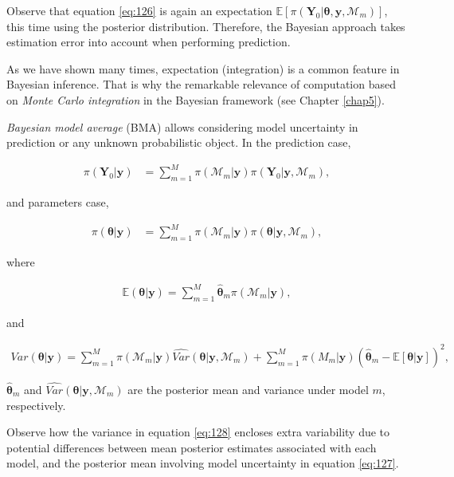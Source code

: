 Observe that equation \ref{eq:126} is again an expectation $\mathbb{E}[\pi(\mathbf{Y}_0|\mathbf{\theta},\mathbf{y},\mathcal{M}_m)]$, this time using the posterior distribution. Therefore,  the Bayesian approach takes estimation error into account when performing prediction. 

As we have shown many times, expectation (integration) is a common feature in Bayesian inference. That is why the remarkable relevance of computation based on \textit{Monte Carlo integration} in the Bayesian framework (see Chapter \ref{chap5}).  

\textit{Bayesian model average} (BMA) allows considering model uncertainty in prediction or any unknown probabilistic object. In the prediction case, 

\begin{align}
	\pi(\mathbf{Y}_0|\mathbf{y})&=\sum_{m=1}^M \pi(\mathcal{M}_m|\mathbf{y})\pi(\mathbf{Y}_0|\mathbf{y},\mathcal{M}_m),
\end{align}

and parameters case,

\begin{align}
	\pi(\mathbf{\theta}|\mathbf{y})&=\sum_{m=1}^M \pi(\mathcal{M}_m|\mathbf{y})\pi(\mathbf{\theta}|\mathbf{y},\mathcal{M}_m),
\end{align}

where 

\begin{align}
	\mathbb{E}(\mathbf{\theta}|\mathbf{y})=\sum_{m=1}^{M}\hat{\mathbf{\theta}}_m \pi(\mathcal{M}_m|\mathbf{y}),
	\label{eq:127}
\end{align}

and

\begin{align}
	Var(\mathbf{\theta}|\mathbf{y})= \sum_{m=1}^{M}\pi(\mathcal{M}_m|\mathbf{y}) \widehat{Var} (\mathbf{\theta}|\mathbf{y},\mathcal{M}_m)+\sum_{m=1}^{M} \pi(M_m|\mathbf{y}) (\hat{\mathbf{\theta}}_m-\mathbb{E}[\mathbf{\theta}|\mathbf{y}])^2,
	\label{eq:128}
\end{align}

$\hat{\mathbf{\theta}}_m$ and $\widehat{Var}(\mathbf{\theta}|\mathbf{y},\mathcal{M}_m)$ are the posterior mean and variance under model $m$, respectively.

Observe how the variance in equation \ref{eq:128} encloses extra variability due to potential differences between mean posterior estimates associated with each model, and the posterior mean involving model uncertainty in equation \ref{eq:127}.

